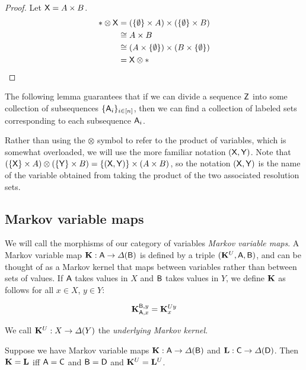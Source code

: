 \begin{proof}
Let $\mathsf{X}=A\times B$.
\begin{align}
	*\otimes \mathsf{X} &= (\{\emptyset\}\times A)\times(\{\emptyset\}\times B)\\
					&\cong A\times B\\
					&\cong (A\times \{\emptyset\})\times(B\times \{\emptyset\})\\
					&= \mathsf{X}\otimes *
\end{align}
\end{proof}

The following lemma guarantees that if we can divide a sequence $\mathsf{Z}$ into some collection of subsequences $\{\mathsf{A}_i\}_{i\in [n]}$, then we can find a collection of labeled sets corresponding to each subsequence $\mathsf{A}_i$.

Rather than using the $\otimes$ symbol to refer to the product of variables, which is somewhat overloaded, we will use the more familiar notation $(\mathsf{X},\mathsf{Y})$. Note that $(\{\mathsf{X}\}\times A)\otimes (\{\mathsf{Y}\}\times B) = \{(\mathsf{X},\mathsf{Y})\}\times (A\times B)$, so the notation $(\mathsf{X},\mathsf{Y})$ is the name of the variable obtained from taking the product of the two associated resolution sets.

\subsection{Markov variable maps}\label{sec:labeled_kernels}

We will call the morphisms of our category of variables \emph{Markov variable maps}. A Markov variable map $\mathbf{K}:\mathsf{A}\to \Delta(\mathsf{B})$ is defined by a triple $(\mathbf{K}^U,\mathsf{A},\mathsf{B})$, and can be thought of as a Markov kernel that maps between variables rather than between sets of values. If $\mathsf{A}$ takes values in $X$ and $\mathsf{B}$ takes values in $Y$, we define $\mathbf{K}$ as follows for all $x\in X$, $y\in Y$:

\begin{align}
	\mathbf{K}_{\mathsf{A},x}^{\mathsf{B},y}  = \mathbf{K}^{U y}_x
\end{align}

We call $\mathbf{K}^U:X\to \Delta(Y)$ the \emph{underlying Markov kernel}.

Suppose we have Markov variable maps $\mathbf{K}:\mathsf{A}\to \Delta(\mathsf{B})$ and $\mathbf{L}:\mathsf{C}\to \Delta(\mathsf{D})$. Then $\mathbf{K}=\mathbf{L}$ iff $\mathsf{A}= \mathsf{C}$ and $\mathsf{B}= \mathsf{D}$ and $\mathbf{K}^U=\mathbf{L}^U$.


